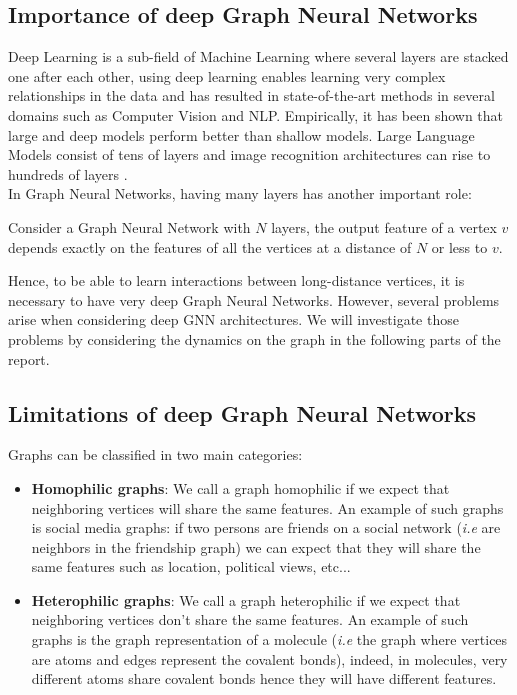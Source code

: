 \documentclass[12pt]{article}
\begin{document}
\subsection{Importance of deep Graph Neural Networks}

Deep Learning is a sub-field of Machine Learning where several layers are stacked one after each other, using deep learning enables learning very complex relationships in the data and has resulted in state-of-the-art methods in several domains such as Computer Vision and NLP. Empirically, it has been shown that large and deep models perform better than shallow models. Large Language Models consist of tens of layers  and image recognition architectures can rise to hundreds of layers .\\

In Graph Neural Networks, having many layers has another important role:

\begin{thm}
    Consider a Graph Neural Network with $N$ layers, the output feature of a vertex $v$ depends exactly on the features of all the vertices at a distance of $N$ or less to $v$.
\end{thm}

Hence, to be able to learn interactions between long-distance vertices, it is necessary to have very deep Graph Neural Networks. However, several problems arise when considering deep GNN architectures. We will investigate those problems by considering the dynamics on the graph in the following parts of the report.

\subsection{Limitations of deep Graph Neural Networks}

\begin{definition}
    Graphs can be classified in two main categories:
    \begin{itemize}
        \item \textbf{Homophilic graphs}: We call a graph homophilic if we expect that neighboring vertices will share the same features. An example of such graphs is social media graphs: if two persons are friends on a social network (\textit{i.e} are neighbors in the friendship graph) we can expect that they will share the same features such as location, political views, etc...

        \item  \textbf{Heterophilic graphs}: We call a graph heterophilic if we expect that neighboring vertices don't share the same features. An example of such graphs is the graph representation of a molecule (\textit{i.e} the graph where vertices are atoms and edges represent the covalent bonds), indeed, in molecules, very different atoms share covalent bonds hence they will have different features.
    \end{itemize}
\end{definition}
\end{document}
